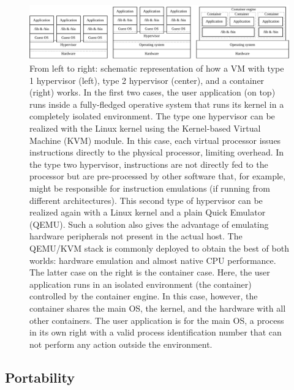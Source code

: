 \begin{figure}[h]
    \centering
    \includegraphics[width=\textwidth]{img/chpt1/VM-vs-Container}
    \caption{From left to right: schematic representation of how a VM with type
      1 hypervisor (left), type 2 hypervisor (center), and a container (right)
      works. In the first two cases, the user application (on top) runs inside a
      fully-fledged operative system that runs its kernel in a completely
      isolated environment. The type one hypervisor can be realized with the
      Linux kernel using the Kernel-based Virtual Machine (KVM)  module. In this
      case, each virtual processor issues instructions directly to the physical
      processor, limiting overhead. In the type two hypervisor, instructions are
      not directly fed to the processor but are pre-processed by other software
      that, for example, might be responsible for instruction emulations (if
      running from different architectures). This second type of hypervisor can
      be realized again with a Linux kernel and a plain Quick Emulator (QEMU).
      Such a solution also gives the advantage of emulating hardware peripherals
      not present in the actual host. The QEMU/KVM stack is commonly deployed to
      obtain the best of both worlds: hardware emulation and almost native CPU
      performance. The latter case on the right is the container case. Here, the
      user application runs in an isolated environment (the container)
      controlled by the container engine. In this case, however, the container
      shares the main OS, the kernel, and the hardware with all other
      containers. The user application is for the main OS, a process in its own
      right with a valid process identification number that can not perform any
      action outside the environment.}
    \label{fig:VM-vs-Container}
\end{figure}


\subsection{Portability}\label{subsec:chpt1-portability}

